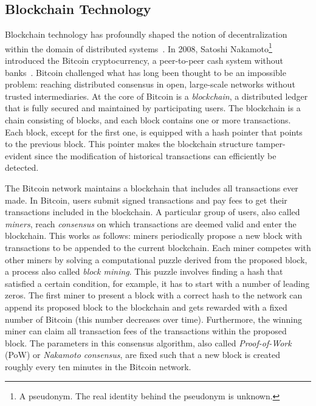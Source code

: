 \subsection{Blockchain Technology}
Blockchain technology has profoundly shaped the notion of decentralization within the domain of distributed systems~\cite{aste2017blockchain}.
In 2008, Satoshi Nakamoto\footnote{A pseudonym. The real identity behind the pseudonym is unknown.} introduced the Bitcoin cryptocurrency, a peer-to-peer cash system without banks~\cite{nakamoto2008bitcoin}.
Bitcoin challenged what has long been thought to be an impossible problem: reaching distributed consensus in open, large-scale networks without trusted intermediaries.
At the core of Bitcoin is a \emph{blockchain}, a distributed ledger that is fully secured and maintained by participating users.
The blockchain is a chain consisting of blocks, and each block contains one or more transactions.
Each block, except for the first one, is equipped with a hash pointer that points to the previous block.
This pointer makes the blockchain structure tamper-evident since the modification of historical transactions can efficiently be detected.

The Bitcoin network maintains a blockchain that includes all transactions ever made.
In Bitcoin, users submit signed transactions and pay fees to get their transactions included in the blockchain.
A particular group of users, also called \emph{miners}, reach \emph{consensus} on which transactions are deemed valid and enter the blockchain.
This works as follows: miners periodically propose a new block with transactions to be appended to the current blockchain.
Each miner competes with other miners by solving a computational puzzle derived from the proposed block, a process also called \emph{block mining}.
This puzzle involves finding a hash that satisfied a certain condition, for example, it has to start with a number of leading zeros.
The first miner to present a block with a correct hash to the network can append its proposed block to the blockchain and gets rewarded with a fixed number of Bitcoin (this number decreases over time).
Furthermore, the winning miner can claim all transaction fees of the transactions within the proposed block.
The parameters in this consensus algorithm, also called \emph{Proof-of-Work} (PoW) or \emph{Nakamoto consensus}, are fixed such that a new block is created roughly every ten minutes in the Bitcoin network.


